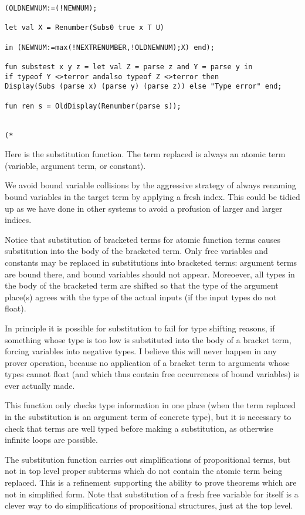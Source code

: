 \documentclass{article}
\begin{document}
{{\begin{verbatim}
(OLDNEWNUM:=(!NEWNUM);

let val X = Renumber(Subs0 true x T U)

in (NEWNUM:=max(!NEXTRENUMBER,!OLDNEWNUM);X) end);

fun substest x y z = let val Z = parse z and Y = parse y in
if typeof Y <>terror andalso typeof Z <>terror then
Display(Subs (parse x) (parse y) (parse z)) else "Type error" end;

fun ren s = OldDisplay(Renumber(parse s));
 

(*

\end{verbatim}

Here is the substitution function.  The term replaced is always an atomic term (variable, argument term, or constant).

We avoid bound variable collisions by the aggressive strategy of always renaming bound variables in the target term by applying a fresh index.  This could be tidied up
as we have done in other systems to avoid a profusion of larger and larger indices.

Notice that substitution of bracketed terms for atomic function terms causes substitution into the body of the bracketed term.  Only free variables and constants
may be replaced in substitutions into bracketed terms:  argument terms are bound there, and bound variables should not appear.  Moreoever, all types in the body of the bracketed term
are shifted so that the type of the argument place(s) agrees with the type of the actual inputs (if the input types do not float).

In principle it is possible for substitution to fail for type shifting reasons, if something whose type is too low is substituted into the body of a bracket term, forcing variables into negative types.
I believe this will never happen in any prover operation, because no application of a bracket term to arguments whose types cannot float (and which thus contain free occurrences of
bound variables) is ever actually made.

This function only checks type information in one place (when the term replaced in the substitution is an argument term of concrete type), but 
it is necessary to check that terms are well typed before making a substitution, as otherwise infinite loops are possible.

The substitution function carries out simplifications of propositional terms, but  not in top level proper subterms which do not contain the atomic term being replaced.  This is
a refinement supporting the ability to prove theorems which are not in simplified form.  Note that substitution of a fresh free variable for itself is a clever way to do simplifications
of propositional structures, just at the top level.

}}
\end{document}
